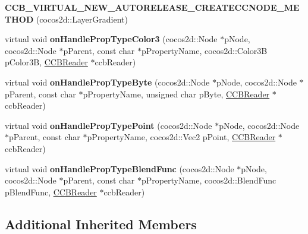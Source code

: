 \begin{DoxyCompactItemize}
\item 
\mbox{\label{classcocosbuilder_1_1LayerGradientLoader_a0e295637251157b4c7ae748bb1b38b42}} 
{\bfseries C\+C\+B\+\_\+\+V\+I\+R\+T\+U\+A\+L\+\_\+\+N\+E\+W\+\_\+\+A\+U\+T\+O\+R\+E\+L\+E\+A\+S\+E\+\_\+\+C\+R\+E\+A\+T\+E\+C\+C\+N\+O\+D\+E\+\_\+\+M\+E\+T\+H\+OD} (cocos2d\+::\+Layer\+Gradient)
\item 
\mbox{\label{classcocosbuilder_1_1LayerGradientLoader_ad32ff639524f393e322e0f96cb14a595}} 
virtual void {\bfseries on\+Handle\+Prop\+Type\+Color3} (cocos2d\+::\+Node $\ast$p\+Node, cocos2d\+::\+Node $\ast$p\+Parent, const char $\ast$p\+Property\+Name, cocos2d\+::\+Color3B p\+Color3B, \hyperlink{classcocosbuilder_1_1CCBReader}{C\+C\+B\+Reader} $\ast$ccb\+Reader)
\item 
\mbox{\label{classcocosbuilder_1_1LayerGradientLoader_a7d51afec3bfbb3d887825c77b5c8dcbd}} 
virtual void {\bfseries on\+Handle\+Prop\+Type\+Byte} (cocos2d\+::\+Node $\ast$p\+Node, cocos2d\+::\+Node $\ast$p\+Parent, const char $\ast$p\+Property\+Name, unsigned char p\+Byte, \hyperlink{classcocosbuilder_1_1CCBReader}{C\+C\+B\+Reader} $\ast$ccb\+Reader)
\item 
\mbox{\label{classcocosbuilder_1_1LayerGradientLoader_a32cba4ccaa5f7dff9e0d05b8bbcd6db6}} 
virtual void {\bfseries on\+Handle\+Prop\+Type\+Point} (cocos2d\+::\+Node $\ast$p\+Node, cocos2d\+::\+Node $\ast$p\+Parent, const char $\ast$p\+Property\+Name, cocos2d\+::\+Vec2 p\+Point, \hyperlink{classcocosbuilder_1_1CCBReader}{C\+C\+B\+Reader} $\ast$ccb\+Reader)
\item 
\mbox{\label{classcocosbuilder_1_1LayerGradientLoader_a24fe2926f7e595b5c54e6ab5cf38a3f8}} 
virtual void {\bfseries on\+Handle\+Prop\+Type\+Blend\+Func} (cocos2d\+::\+Node $\ast$p\+Node, cocos2d\+::\+Node $\ast$p\+Parent, const char $\ast$p\+Property\+Name, cocos2d\+::\+Blend\+Func p\+Blend\+Func, \hyperlink{classcocosbuilder_1_1CCBReader}{C\+C\+B\+Reader} $\ast$ccb\+Reader)
\end{DoxyCompactItemize}
\subsection*{Additional Inherited Members}


